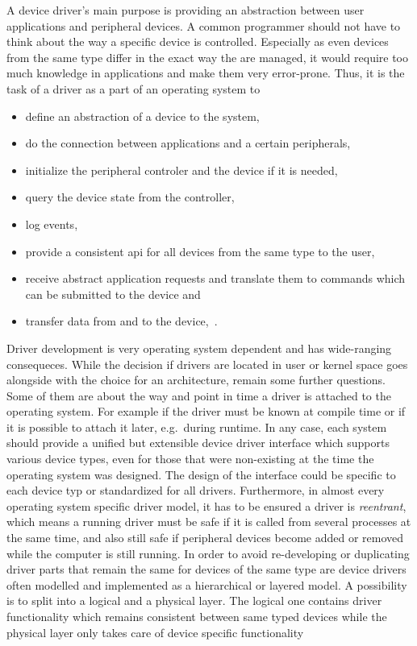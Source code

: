 A device driver's main purpose is providing an abstraction between user applications and peripheral devices\cite{glatz2015betriebssysteme}.
A common programmer should not have to think about the way a specific device is controlled.
Especially as even devices from the same type differ in the exact way the are managed, it would require too much knowledge in applications and make them very error-prone.
Thus, it is the task of a driver as a part of an operating system to 
\begin{itemize}
    \item define an abstraction of a device to the system,
    \item do the connection between applications and a certain peripherals, 
    \item initialize the peripheral controler and the device if it is needed,
    \item query the device state from the controller,
    \item log events,
    \item provide a consistent \ac{api} for all devices from the same type to the user,
    \item receive abstract application requests and translate them to commands which can be submitted to the device and
    \item transfer data from and to the device\cite{glatz2015betriebssysteme},~\cite{tanenbaum-modern-operating-systems}.
\end{itemize}
%
Driver development is very operating system dependent and has wide-ranging consequeces.
While the decision if drivers are located in user or kernel space goes alongside with the choice for an architecture, remain some further questions.
Some of them are about the way and point in time a driver is attached to the operating system.
For example if the driver must be known at compile time or if it is possible to attach it later, e.g.\ during runtime\cite{tanenbaum-modern-operating-systems}.
In any case, each system should provide a unified but extensible device driver interface which supports various device types, even for those that were non-existing at the time the operating system was designed\cite{glatz2015betriebssysteme}.
The design of the interface could be specific to each device typ or standardized for all drivers\cite{tanenbaum-modern-operating-systems}.
Furthermore, in almost every operating system specific driver model, it has to be ensured a driver is \textit{reentrant}, which means a running driver must be safe if it is called from several processes at the same time, and also still safe if peripheral devices become added or removed while the computer is still running\cite{tanenbaum-modern-operating-systems}.
In order to avoid re-developing or duplicating driver parts that remain the same for devices of the same type are device drivers often modelled and implemented as a hierarchical or layered model.
A possibility is to split into a logical and a physical layer.
The logical one contains driver functionality which remains consistent between same typed devices while the physical layer only takes care of device specific functionality\cite{tanenbaum-modern-operating-systems} 

